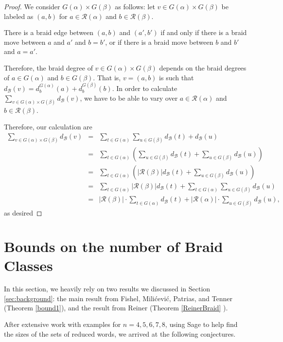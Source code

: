 \documentclass[11pt,reqno]{amsart}
\theoremstyle{definition}
\theoremstyle{notation}
\newcommand{\calR}{\mathcal{R}}
\newcommand{\calB}{\mathcal{B}}
\begin{document}
\begin{proof}
We consider $G(\alpha)\times G(\beta)$ as follows: let $v\in G(\alpha)\times G(\beta)$ be labeled as $(a,b)$ for $a\in \calR(\alpha)$ and $b\in \calR(\beta)$.

There is a braid edge between $(a,b)$ and $(a',b')$ if and only if there is a braid move between $a$ and $a'$ and $b=b'$, or if there is a braid move between $b$ and $b'$ and $a=a'$.

Therefore, the braid degree of $v\in G(\alpha)\times G(\beta)$ depends on the braid degrees of $a\in G(\alpha)$ and $b\in G(\beta)$. That is, $v=(a,b)$ is such that $d_\calB(v) =d_b^{G(\alpha)}(a) + d_b^{G(\beta)}(b) $. In order to calculate $\sum_{v\in G(\alpha) \times G(\beta)}d_\calB(v)$, we have to be able to vary over $a\in \calR(\alpha)$ and $b\in \calR(\beta)$.

Therefore, our calculation are
\begin{eqnarray*}
\sum_{v\in G(\alpha) \times G(\beta)}d_\calB(v) &=& \sum_{t\in G(\alpha)} \sum_{u\in G(\beta) } d_\calB(t) +d_\calB(u) \\
&=& \sum_{t\in G(\alpha)} \left ( \sum_{u\in G(\beta) } d_\calB(t) + \sum_{u\in G(\beta) }d_\calB(u) \right )\\
&=&  \sum_{t\in G(\alpha)} \left ( |\calR(\beta)| d_\calB(t) + \sum_{u\in G(\beta) }d_\calB(u) \right )\\
&=& \sum_{t\in G(\alpha)}|\calR(\beta)| d_\calB(t) +  \sum_{t\in G(\alpha)}\sum_{u\in G(\beta) }d_\calB(u)\\
&=& |\calR(\beta)|\cdot \sum_{t\in G(\alpha)} d_\calB(t) +  |\calR(\alpha)| \cdot \sum_{u\in G(\beta) }d_\calB(u),
\end{eqnarray*}
as desired
\end{proof}

\section{Bounds on the number of Braid Classes}\label{sec:motivation}%

In this section, we heavily rely on two results we discussed in Section \ref{sec:background}: the main result from Fishel, Milićević, Patrias, and Tenner (Theorem \ref{bound1}\cite{F}), and the result from Reiner (Theorem \ref{ReinerBraid} \cite{R}).




After extensive work with examples for $n=4,5,6,7,8$, using Sage to help find the sizes of the sets of reduced words, we arrived at the following conjectures.
\end{document}
